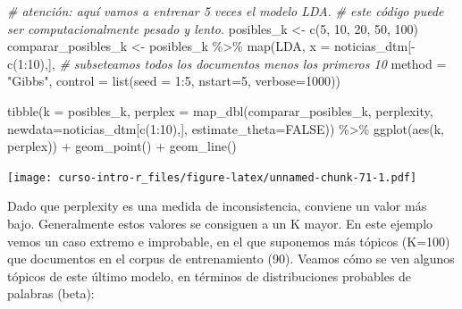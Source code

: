 \documentclass[
]{book}
\newenvironment{Shaded}{\begin{snugshade}}{\end{snugshade}}
\newcommand{\AttributeTok}[1]{\textcolor[rgb]{0.77,0.63,0.00}{#1}}
\newcommand{\CommentTok}[1]{\textcolor[rgb]{0.56,0.35,0.01}{\textit{#1}}}
\newcommand{\ConstantTok}[1]{\textcolor[rgb]{0.00,0.00,0.00}{#1}}
\newcommand{\DecValTok}[1]{\textcolor[rgb]{0.00,0.00,0.81}{#1}}
\newcommand{\FunctionTok}[1]{\textcolor[rgb]{0.00,0.00,0.00}{#1}}
\newcommand{\NormalTok}[1]{#1}
\newcommand{\OtherTok}[1]{\textcolor[rgb]{0.56,0.35,0.01}{#1}}
\newcommand{\SpecialCharTok}[1]{\textcolor[rgb]{0.00,0.00,0.00}{#1}}
\newcommand{\StringTok}[1]{\textcolor[rgb]{0.31,0.60,0.02}{#1}}
\begin{document}
\begin{Shaded}
\begin{Highlighting}[]
\CommentTok{\# atención: aquí vamos a entrenar 5 veces el modelo LDA. }
\CommentTok{\# este código puede ser computacionalmente pesado y lento.}
\NormalTok{posibles\_k }\OtherTok{\textless{}{-}} \FunctionTok{c}\NormalTok{(}\DecValTok{5}\NormalTok{, }\DecValTok{10}\NormalTok{, }\DecValTok{20}\NormalTok{, }\DecValTok{50}\NormalTok{, }\DecValTok{100}\NormalTok{)}
\NormalTok{comparar\_posibles\_k }\OtherTok{\textless{}{-}}\NormalTok{ posibles\_k }\SpecialCharTok{\%\textgreater{}\%}
  \FunctionTok{map}\NormalTok{(LDA, }
      \AttributeTok{x =}\NormalTok{ noticias\_dtm[}\SpecialCharTok{{-}}\FunctionTok{c}\NormalTok{(}\DecValTok{1}\SpecialCharTok{:}\DecValTok{10}\NormalTok{),], }\CommentTok{\# subseteamos todos los documentos menos los primeros 10}
      \AttributeTok{method =} \StringTok{"Gibbs"}\NormalTok{,}
      \AttributeTok{control =} \FunctionTok{list}\NormalTok{(}\AttributeTok{seed =} \DecValTok{1}\SpecialCharTok{:}\DecValTok{5}\NormalTok{, }\AttributeTok{nstart=}\DecValTok{5}\NormalTok{, }\AttributeTok{verbose=}\DecValTok{1000}\NormalTok{))}
\end{Highlighting}
\end{Shaded}

\begin{Shaded}
\begin{Highlighting}[]
\FunctionTok{tibble}\NormalTok{(}\AttributeTok{k =}\NormalTok{ posibles\_k,}
           \AttributeTok{perplex =} \FunctionTok{map\_dbl}\NormalTok{(comparar\_posibles\_k, perplexity, }
                             \AttributeTok{newdata=}\NormalTok{noticias\_dtm[}\FunctionTok{c}\NormalTok{(}\DecValTok{1}\SpecialCharTok{:}\DecValTok{10}\NormalTok{),], }
                             \AttributeTok{estimate\_theta=}\ConstantTok{FALSE}\NormalTok{)) }\SpecialCharTok{\%\textgreater{}\%}
  \FunctionTok{ggplot}\NormalTok{(}\FunctionTok{aes}\NormalTok{(k, perplex)) }\SpecialCharTok{+}
  \FunctionTok{geom\_point}\NormalTok{() }\SpecialCharTok{+}
  \FunctionTok{geom\_line}\NormalTok{()}
\end{Highlighting}
\end{Shaded}

\texttt{[image: curso-intro-r\_files/figure-latex/unnamed-chunk-71-1.pdf]}

Dado que perplexity es una medida de inconsistencia, conviene un valor más bajo. Generalmente estos valores se consiguen a un K mayor. En este ejemplo vemos un caso extremo e improbable, en el que suponemos más tópicos (K=100) que documentos en el corpus de entrenamiento (90). Veamos cómo se ven algunos tópicos de este último modelo, en términos de distribuciones probables de palabras (beta):
\end{document}
